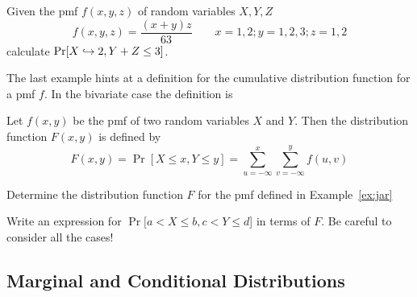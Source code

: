\documentclass[../main.tex]{subfiles}
\begin{document}
\begin{example}
Given the pmf $f(x,y,z)$ of random variables $X,Y,Z$
$$f(x,y,z) = \frac{(x+y)z}{63}\qquad x=1,2; y=1,2,3; z=1,2$$
calculate $\mathrm{Pr}[X \hookrightarrow 2, Y+Z \leq 3]$.
\end{example}

The last example hints at a definition for the cumulative
distribution function for a pmf $f$. In the bivariate case the definition is
\begin{definition}
Let $f(x,y)$ be the pmf of two random variables $X$ and $Y$. Then the distribution function $F(x,y)$ is defined by
$$F(x,y) = \Pr[X \leq x, Y \leq y] = \sum_{u=-\infty}^x \sum_{v=-\infty}^y f(u,v)$$
\end{definition}
\begin{example}
Determine the distribution function $F$ for the pmf defined in Example~\ref{ex:jar}
\end{example}
\begin{example}
Write an expression for $\Pr[a<X\leq b, c< Y \leq d$] in terms of $F$. Be 
careful to consider all the cases!
\end{example}

\subsection{Marginal and Conditional Distributions}
\end{document}
